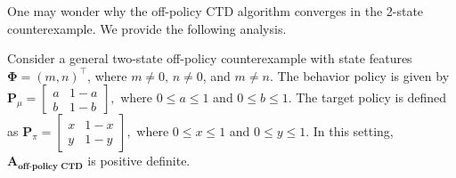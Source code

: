 One may wonder why the off-policy CTD algorithm converges in the 2-state counterexample.
 We provide the following analysis.
\begin{lemma}
    Consider a general two-state off-policy counterexample with state features  
    $
    \bm{\Phi} = (m, n)^{\top}$, where $m\neq 0$, $n\neq 0$, and $m \neq n$.
    The behavior policy is given by  
    $
    \textbf{P}_{\mu}=
    \begin{bmatrix}
    a & 1-a \\
    b & 1-b
    \end{bmatrix},
    $
    where \( 0 \leqslant a \leqslant 1 \) and \( 0 \leqslant b \leqslant 1 \).  
    The target policy is defined as  
    $
    \textbf{P}_{\pi}=
    \begin{bmatrix}
    x & 1-x \\
    y & 1-y
    \end{bmatrix},
    $
    where \( 0 \leqslant x \leqslant 1 \) and \( 0 \leqslant y \leqslant 1 \).  
    In this setting, $\textbf{A}_{\textbf{off-policy CTD}}$ is  positive definite.
\end{lemma}
